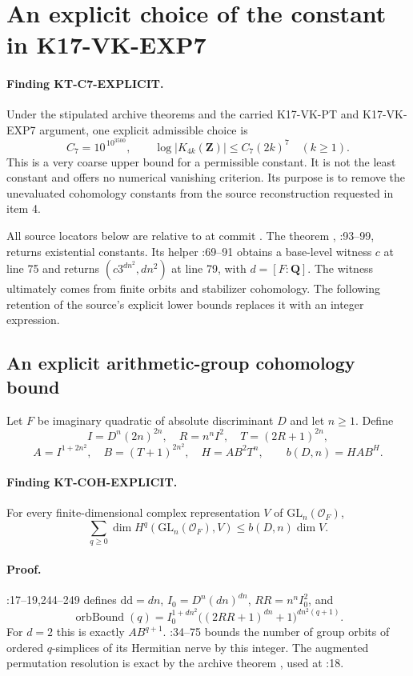 \section{An explicit choice of the constant in K17-VK-EXP7}
\label{sec:kt-c7-explicit}

\paragraph{Finding KT-C7-EXPLICIT.}
Under the stipulated archive theorems and the carried K17-VK-PT and
K17-VK-EXP7 argument, one explicit admissible choice is
\[
 C_7=10^{\,10^{3500}},\qquad
 \log|K_{4k}(\mathbf Z)|\le C_7(2k)^7\quad(k\ge1).
\]
This is a very coarse upper bound for a permissible constant.  It is
not the least constant and offers no numerical vanishing criterion.
Its purpose is to remove the unevaluated cohomology constants from the
source reconstruction requested in item 4.

All source locators below are relative to
at commit .
The theorem ,
:93--99,
returns existential constants.  Its helper :69--91
obtains a base-level witness $c$ at line 75 and returns
$(c3^{dn^2},dn^2)$ at line 79, with $d=[F:\mathbf Q]$.
The witness ultimately comes from finite orbits and stabilizer
cohomology.  The following retention of the source's explicit lower
bounds replaces it with an integer expression.

\subsection{An explicit arithmetic-group cohomology bound}

Let $F$ be imaginary quadratic of absolute discriminant $D$ and let
$n\ge1$.  Define
\[
 I=D^n(2n)^{2n},\quad R=n^nI^2,\quad T=(2R+1)^{2n},
\]
\[
 A=I^{1+2n^2},\quad B=(T+1)^{2n^2},\quad H=AB^2T^n,
 \qquad b(D,n)=HAB^H.
\tag{KT-C7.1}
\]
\paragraph{Finding KT-COH-EXPLICIT.}
For every finite-dimensional complex representation $V$ of
$\mathrm{GL}_n(\mathcal O_F)$,
\[
 \sum_{q\ge0}\dim H^q(\mathrm{GL}_n(\mathcal O_F),V)
 \le b(D,n)\dim V.
\tag{KT-C7.2}
\]

\paragraph{Proof.}
:17--19,244--249 defines
$\mathrm{dd}=dn$, $I_0=D^n(dn)^{dn}$, $RR=n^nI_0^2$, and
\[
 \operatorname{orbBound}(q)
 =I_0^{1+dn^2}\bigl((2RR+1)^{dn}+1\bigr)^{dn^2(q+1)}.
\]
For $d=2$ this is exactly $AB^{q+1}$.
:34--75 bounds the number
of group orbits of ordered $q$-simplices of its Hermitian nerve by
this integer.  The augmented permutation resolution is exact by the
archive theorem , used at
:18.

